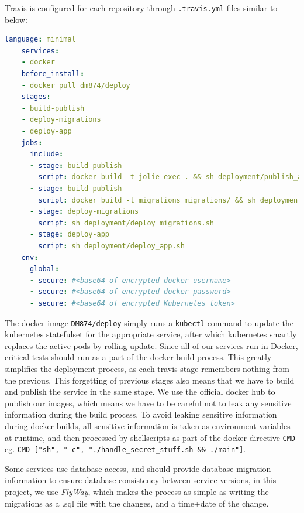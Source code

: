 Travis is configured for each repository through \texttt{.travis.yml} files similar to below:

\begin{lstlisting}[language=yaml]
    language: minimal
    services:
    - docker
    before_install:
    - docker pull dm874/deploy
    stages:
    - build-publish
    - deploy-migrations
    - deploy-app
    jobs:
      include:
      - stage: build-publish
        script: docker build -t jolie-exec . && sh deployment/publish_app.sh
      - stage: build-publish
        script: docker build -t migrations migrations/ && sh deployment/publish_migrations.sh
      - stage: deploy-migrations
        script: sh deployment/deploy_migrations.sh
      - stage: deploy-app
        script: sh deployment/deploy_app.sh
    env:
      global:
      - secure: #<base64 of encrypted docker username>
      - secure: #<base64 of encrypted docker password>
      - secure: #<base64 of encrypted Kubernetes token>
\end{lstlisting}

The docker image \texttt{DM874/deploy} simply runs a \texttt{kubectl} command to update the kubernetes statefulset for the appropriate service, after which kubernetes smartly replaces the active pods by rolling update.
Since all of our services run in Docker, critical tests should run as a part of the docker build process.
This greatly simplifies the deployment process, as each travis stage remembers nothing from the previous. 
This forgetting of previous stages also means that we have to build and publish the service in the same stage. We use the official docker hub to publish our images, which means we have to be careful not to leak any sensitive information during the build process.
To avoid leaking sensitive information during docker builds, all sensitive information is taken as environment variables at runtime, and then processed by shellscripts as part of the docker directive \texttt{CMD} eg. \lstinline{CMD ["sh", "-c", "./handle_secret_stuff.sh && ./main"]}.

Some services use database access, and should provide database migration information to ensure database consistency between service versions, in this project, we use \textit{FlyWay}, which makes the process as simple as writing the migrations as a .sql file with the changes, and a time+date of the change.

